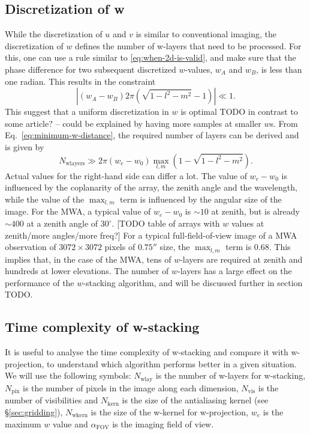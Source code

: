 \documentclass[useAMS,usenatbib]{mn2e}
\begin{document}
\subsection{Discretization of w} \label{sec:gridding-w}
While the discretization of $u$ and $v$ is similar to conventional imaging, the discretization of $w$ defines the number of w-layers that need to be processed. For this, one can use a rule similar to \eqref{eq:when-2d-is-valid}, and make sure that the phase difference for two subsequent discretized $w$-values, $w_A$ and $w_B$,  is less than one radian. This results in the constraint
\begin{equation} \label{eq:minimum-w-distance}
\left|\left(w_A - w_B\right) 2\pi (\sqrt{1-l^2-m^2}-1)\right| \ll 1.
\end{equation}
This suggest that a uniform discretization in $w$ is optimal TODO in contrast to some article? -- could be explained by having more samples at smaller $w$s. From Eq.~\eqref{eq:minimum-w-distance}, the required number of layers can be derived and is given by
\begin{equation} \label{eq:nwlayers-bound}
 N_\textrm{wlayers} \gg 2\pi \left(w_e - w_0\right) \max_{l,m} \left(1 - \sqrt{1-l^2-m^2}\right).
\end{equation}
Actual values for the right-hand side can differ a lot. The value of $w_e - w_0$ is influenced by the coplanarity of the array, the zenith angle and the wavelength, while the value of the $\max_{l,m}$ term is influenced by the angular size of the image. For the MWA, a typical value of $w_e - w_0$ is $\sim 10$ at zenith, but is already $\sim 400$ at a zenith angle of $30^{\circ}$. [TODO table of arrays with $w$ values at zenith/more angles/more freq?] For a typical full-field-of-view image of a MWA observation of $3072\times 3072$ pixels of $0.75''$ size, the $\max_{l,m}$ term is $0.68$. This implies that, in the case of the MWA, tens of $w$-layers are required at zenith and hundreds at lower elevations. The number of $w$-layers has a large effect on the performance of the $w$-stacking algorithm, and will be discussed further in section TODO.

\subsection{Time complexity of w-stacking}
It is useful to analyse the time complexity of w-stacking and compare it with w-projection, to understand which algorithm performs better in a given situation. We will use the following symbols: $N_\textrm{wlay}$ is the number of w-layers for w-stacking, $N_\textrm{pix}$ is the number of pixels in the image along each dimension, $N_\textrm{vis}$ is the number of visibilities and $N_\textrm{kern}$ is the size of the antialiasing kernel (see \S\ref{sec:gridding}), $N_\textrm{wkern}$ is the size of the w-kernel for w-projection, $w_e$ is the maximum $w$ value and $\alpha_\textrm{FOV}$ is the imaging field of view.
\end{document}
